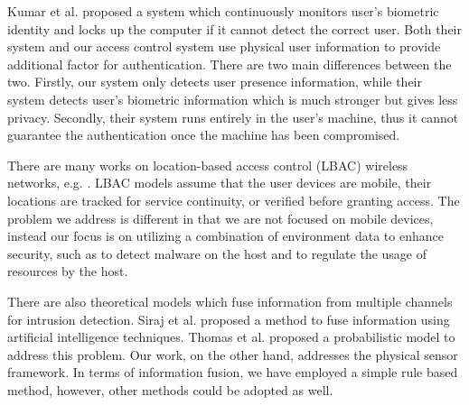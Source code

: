 Kumar et al. proposed a system 
\cite{kumar2005using,yap2008physical,kwang2009usability} which continuously monitors
user's biometric identity and locks up the computer if it cannot detect
the correct user.
Both their system and our access control system use physical user
information to provide additional factor for authentication.
There are two main differences between the two.
Firstly, our system only detects user presence information, while
their system detects user's biometric information which is much
stronger but gives less privacy.
Secondly, their system runs entirely in the user's machine, thus
it cannot guarantee the authentication once the machine has been compromised.

There are many works on location-based access control (LBAC) 
wireless networks, e.g. \cite{ardagna2006supporting}. 
LBAC models assume that the user devices are mobile,
their locations are tracked for service continuity, or verified
before granting access.  The problem we address is different in that
we are not focused on mobile devices, instead our focus is on
utilizing a combination of environment data to enhance security,
such as to detect malware on the host and to regulate the usage of
resources by the host.

There are also theoretical models which fuse information from multiple channels
for intrusion detection.
Siraj et al. proposed a method \cite{siraj2004intrusion} to fuse information
using artificial intelligence techniques.
Thomas et al. proposed a probabilistic model \cite{thomas2009improvement} to address
this problem.
Our work, on the other hand, addresses the physical sensor framework.
In terms of information fusion, we have employed
a simple rule based method, however, other methods could be adopted as well.
